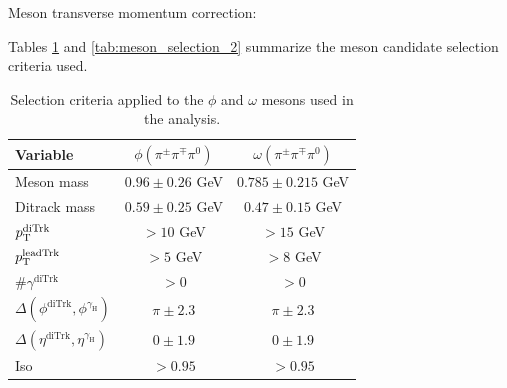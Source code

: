 \begin{myitemlist}

    \item[Meson transverse momentum correction:] 

\end{myitemlist}

Tables \ref{tab:meson_selection_1} and \ref{tab:meson_selection_2} summarize the meson candidate selection criteria used.

\begin{table}[!ht]
    \centering
    \begin{tabular}{|l|c|c|}
        \hline
        \cellcolor{lightgray}Variable & \cellcolor{lightgray}$\phi(\pi^{\pm}\pi^{\mp}\pi^{0})$ & \cellcolor{lightgray}$\omega(\pi^{\pm}\pi^{\mp}\pi^{0})$ \\ \hline
        Meson mass                                              &$0.96\pm0.26$ GeV  &$0.785\pm0.215$ GeV    \\
        Ditrack mass                                            &$0.59\pm0.25$ GeV  &$0.47\pm0.15$ GeV      \\
        $p_\text{T}^{\text{diTrk}}$                                  &$>10$ GeV          &$>15$ GeV              \\
        $p_\text{T}^{\text{leadTrk}}$                                &$>5$ GeV           &$>8$ GeV               \\
        $\#\gamma^{\text{diTrk}}$                               &$>0$               &$>0$                   \\
        $\Delta(\phi^{\text{diTrk}}, \phi^{\gamma_\text{H}})$   &$\pi\pm2.3$    &$\pi\pm2.3$        \\
        $\Delta(\eta^{\text{diTrk}}, \eta^{\gamma_\text{H}})$   &$0\pm1.9$          &$0\pm1.9$              \\
        Iso                                                     &$>0.95$            &$>0.95$                \\
        \hline
        \end{tabular}
    \caption{Selection criteria applied to the $\phi$ and $\omega$ mesons used in the analysis.}
    \label{tab:meson_selection_1}
\end{table}

